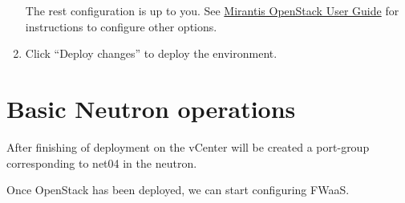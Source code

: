 \documentclass{article}
\begin{document}
\begin{enumerate}
The rest configuration is up to you. See \href{https://docs.mirantis.com/openstack/fuel/fuel-6.1/user-guide.html}{Mirantis OpenStack User Guide} for instructions to configure other options.

\item Click ``Deploy changes'' to deploy the environment.

\end{enumerate}

\section{Basic Neutron operations}

After finishing of deployment on the vCenter will be created a port-group corresponding to net04 in the neutron.

Once OpenStack has been deployed, we can start configuring FWaaS.
\end{document}
